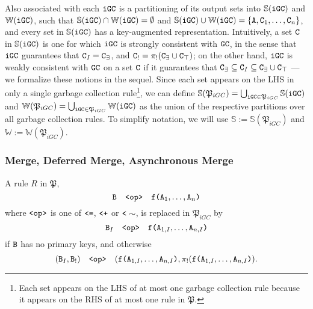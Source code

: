 Also associated with each $\tt{iGC}$ is a partitioning of its output sets into $\mathbb{S}(\tt{iGC})$ and $\mathbb{W}(\tt{iGC})$, such that $\mathbb{S}(\tt{iGC}) \cap \mathbb{W}(\tt{iGC}) = \emptyset$ and $\mathbb{S}(\tt{iGC}) \cup \mathbb{W}(\tt{iGC}) = \{\tt{A}, \tt{C}_1, \dots, \tt{C}_n\}$,
and every set in $\mathbb{S}(\tt{iGC})$ has a key-augmented representation.
Intuitively, a set $\tt{C}$ in $\mathbb{S}(\tt{iGC})$ is one for which $\tt{iGC}$ is strongly consistent with $\tt{GC}$, in the sense that $\tt{iGC}$ guarantees that $\tt{C}_I = \tt{C}_\exists$, and $\tt{C}_! = \pi_!(\tt{C}_\exists \cup \tt{C}_\top)$;
on the other hand, $\tt{iGC}$ is weakly consistent with $\tt{GC}$ on a set $\tt{C}$ if it guarantees that $\tt{C}_\exists \subseteq \tt{C}_I \subseteq \tt{C}_\exists \cup \tt{C}_\top$
--- we formalize these notions in the sequel.
Since each set appears on the LHS in only a single garbage collection rule\footnote{
	Each set appears on the LHS of at most one garbage collection rule because it appears on the RHS of at most one rule in $\mathfrak{P}$.
}, we can define
$\mathbb{S}(\mathfrak{P}_{iGC}) = \bigcup_{\tt{iGC} \in \mathfrak{P}_{iGC}} \mathbb{S}(\tt{iGC})$
and
$\mathbb{W}(\mathfrak{P}_{iGC}) = \bigcup_{\tt{iGC} \in \mathfrak{P}_{iGC}} \mathbb{W}(\tt{iGC})$
as the union of the respective partitions over all garbage collection rules.
To simplify notation, we will use $\mathbb{S} := \mathbb{S}(\mathfrak{P}_{iGC})$ and $\mathbb{W} := \mathbb{W}(\mathfrak{P}_{iGC})$.


\subsubsection{Merge, Deferred Merge, Asynchronous Merge}
A rule $R$ in $\mathfrak{P}$,
\[\tt{B} \quad\tt{<op>}\quad \tt{f}\tt{(}\tt{A}_1,\dots,\tt{A}_n\tt{)}\]
where $\tt{<op>}$ is one of $\tt{<=}$, $\tt{<+}$ or $\tt{<}\sim$, is replaced in $\mathfrak{P}_{iGC}$ by
\[\tt{B}_I \quad\tt{<op>}\quad \tt{f}\tt{(}\tt{A}_{1,I},\dots,\tt{A}_{n,I}\tt{)}\]
if $\tt{B}$ has no primary keys, and otherwise
\[(\tt{B}_I, \tt{B}_!) \quad\tt{<op>}\quad (\tt{f}\tt{(}\tt{A}_{1,I},\dots,\tt{A}_{n,I}\tt{)}, \pi_!(\tt{f}\tt{(}\tt{A}_{1,I},\dots,\tt{A}_{n,I}\tt{)}).\]




